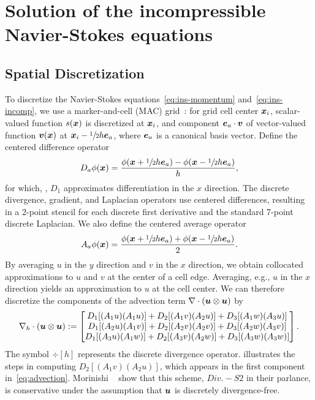 \section{Solution of the incompressible Navier-Stokes equations}\label{sec:ins}

\subsection{Spatial Discretization}\label{sec:ns_space}

To discretize the Navier-Stokes equations~\eqref{eq:ins-momentum} and~\eqref{eq:ins-incomp}, we use a
marker-and-cell (MAC) grid~\cite{Welch:1965jv}: for grid cell center $\boldsymbol{x}_i$, scalar-valued function $s(\boldsymbol{x})$ is
discretized at $\boldsymbol{x}_i$, and component $\boldsymbol{e}_a\cdot\boldsymbol{v}$ of vector-valued function $\boldsymbol{v}(\boldsymbol{x})$ at
$\boldsymbol{x}_i-\sfrac12h\boldsymbol{e}_a$, where $\boldsymbol{e}_a$ is a canonical basis vector. Define the centered difference operator
\begin{equation}
    D_a\phi(\boldsymbol{x}) = \frac{\phi(\boldsymbol{x}+\sfrac12 h\boldsymbol{e}_a) - \phi(\boldsymbol{x}-\sfrac12 h\boldsymbol{e}_a)}{h},
\end{equation}
for which, , $D_1$ approximates differentiation in the $x$ direction. The discrete divergence,
gradient, and Laplacian operators use centered differences, resulting in a 2-point stencil for each discrete first
derivative and the standard 7-point discrete Laplacian. We also define the centered average operator
\begin{equation}
    A_a\phi(\boldsymbol{x}) = \frac{\phi(\boldsymbol{x}+\sfrac12 h\boldsymbol{e}_a) + \phi(\boldsymbol{x}-\sfrac12 h\boldsymbol{e}_a)}2.
\end{equation}
By averaging $u$ in the $y$ direction and $v$ in the $x$ direction, we obtain collocated approximations to $u$ and
$v$ at the center of a cell edge. Averaging, e.g., $u$ in the $x$ direction yields an approximation to $u$ at the
cell center. We can therefore discretize the components of the advection term $\div(\u\otimes\u)$ by
\begin{equation}\label{eq:advection}
    \div[h](\u\otimes\u) :=
    \begin{bmatrix}
        D_1[(A_1 u) (A_1 u)] + D_2[(A_1 v) (A_2 u)] + D_3[(A_1 w) (A_3 u)] \\
        D_1[(A_2 u) (A_1 v)] + D_2[(A_2 v) (A_2 v)] + D_3[(A_2 w) (A_3 v)] \\
        D_1[(A_3 u) (A_1 w)] + D_2[(A_3 v) (A_2 w)] + D_3[(A_3 w) (A_3 w)]
    \end{bmatrix}.
\end{equation}
The symbol $\div[h]$ represents the discrete divergence operator.   illustrates the steps
in computing $D_2[(A_1 v)(A_2 u)]$, which appears in the first component in~\eqref{eq:advection}. Morinishi
~\cite{Morinishi:1998us} show that this scheme, $Div. - S2$ in their parlance, is conservative under
the assumption that $\boldsymbol{u}$ is discretely divergence-free.

